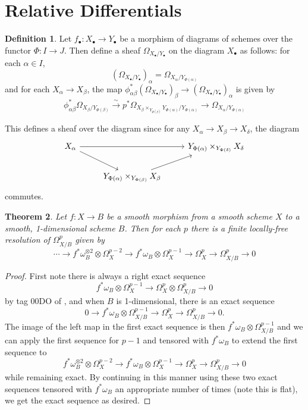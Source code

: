 \documentclass{report}
\newtheorem{theorem}{Theorem}[section]
\theoremstyle{definition}
\newtheorem{definition}[theorem]{Definition}
\begin{document}
\section{Relative Differentials}

\begin{definition}
	Let $f_\bullet : X_\bullet \rightarrow Y_\bullet$ be a morphism of diagrams of schemes over the functor $\Phi : I \rightarrow J$.
	Then define a sheaf $\Omega_{X_\bullet / Y_\bullet}$ on the diagram $X_\bullet$ as follows: for each $\alpha \in I$,
	\[
		(\Omega_{X_\bullet / Y_\bullet})_\alpha = \Omega_{X_\alpha / Y_{\Phi(\alpha)}}
	\]
	and for each $X_\alpha \rightarrow X_\beta$, the map $\phi_{\alpha \beta}^* (\Omega_{X_\bullet / Y_\bullet})_\beta \rightarrow (\Omega_{X_\bullet / Y_\bullet})_\alpha$ is given by
	\[
		\phi_{\alpha \beta}^* \Omega_{X_\beta / Y_{\Phi(\beta)}} \xrightarrow{\sim} p^* \Omega_{X_\beta \times_{Y_{\Phi(\beta)}} Y_{\Phi(\alpha)} / Y_{\Phi(\alpha)}} \rightarrow \Omega_{X_\alpha / Y_{\Phi(\alpha)}}
	\]
	
	This defines a sheaf over the diagram since for any $X_\alpha \rightarrow X_\beta \rightarrow X_\delta$, the diagram
	\[
		\begin{tikzcd}
			X_\alpha \arrow{rr} \arrow{dr} & & Y_{\Phi(\alpha)} \times_{Y_{\Phi(\delta)}} X_\delta \\
			& Y_{\Phi(\alpha)} \times_{Y_{\Phi(\beta)}} X_\beta \arrow{ur} & {}
		\end{tikzcd}
	\]
	commutes.
\end{definition}

\begin{theorem}
	\label{thm:locfreereldiffs}
	Let $f : X \rightarrow B$ be a smooth morphism from a smooth scheme $X$ to a smooth, 1-dimensional scheme $B$.
	Then for each $p$ there is a finite locally-free resolution of $\Omega_{X/B}^p$ given by
	\[
		\cdots \rightarrow f^* \omega_B^{\otimes 2} \otimes \Omega_X^{p-2} \rightarrow f^* \omega_B \otimes \Omega_X^{p-1} \rightarrow
			\Omega^p_X \rightarrow \Omega_{X/B}^p \rightarrow 0
	\]
\end{theorem}
\begin{proof}
	First note there is always a right exact sequence
	\[
		f^* \omega_B \otimes \Omega_X^{p-1} \rightarrow \Omega_X^p \otimes \Omega_{X/B}^p \rightarrow 0
	\]
	by tag 00DO of \cite{stacks}, and when $B$ is 1-dimensional, there is an exact sequence
	\[
		0 \rightarrow f^* \omega_B \otimes \Omega_{X/B}^{p-1} \rightarrow \Omega_X^p \rightarrow \Omega_{X/B}^p \rightarrow 0.
	\]
	The image of the left map in the first exact sequence is then  $f^* \omega_B \otimes \Omega_{X/B}^{p-1}$ and we can apply the first sequence for $p-1$ and tensored with $f^* \omega_B$ to extend the first sequence to 
	\[
	f^* \omega_B^{\otimes 2} \otimes \Omega_X^{p-2} \rightarrow f^* \omega_B \otimes \Omega_X^{p-1} \rightarrow
	\Omega^p_X \rightarrow \Omega_{X/B}^p \rightarrow 0
	\]
	while remaining exact.
	By continuing in this manner using these two exact sequences tensored with $f^* \omega_B$ an appropriate number of times (note this is flat), we get the exact sequence as desired.
\end{proof}
\end{document}
